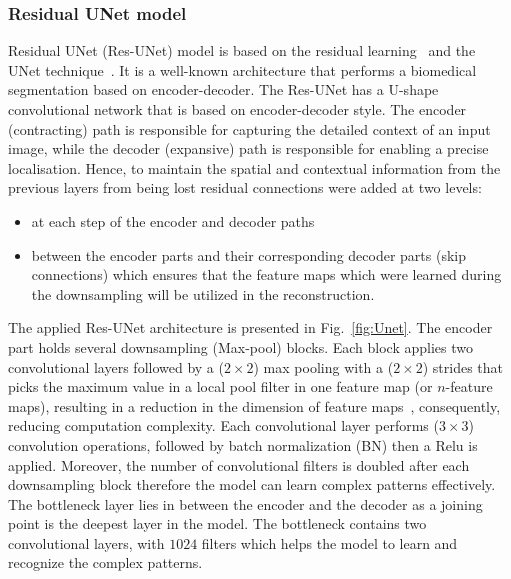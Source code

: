 \subsubsection{Residual UNet model}
Residual UNet (Res-UNet) model is based on the residual learning~\cite{He2016} and the UNet technique~\cite{Ronneberger2015}. 
It is a well-known architecture that performs a biomedical segmentation based on encoder-decoder. 
The Res-UNet has a U-shape convolutional network that is based on encoder-decoder style. 
The encoder (contracting) path is responsible for capturing the detailed context of an input image, while the decoder (expansive) path is responsible for enabling a precise localisation. 
Hence, to maintain the spatial and contextual information from the previous layers from being lost residual connections were added at two levels:
\begin{itemize}
	\item at each step of the encoder and decoder paths
	\item between the encoder parts and their corresponding decoder parts (skip connections) which ensures that the feature maps which were learned during the downsampling will be utilized in the reconstruction. 
\end{itemize}
The applied Res-UNet architecture is presented in Fig.~\ref{fig:Unet}.
The encoder part holds several downsampling (Max-pool) blocks. 
Each block applies two convolutional layers followed by a (\(2\times2\)) max pooling with a (\(2\times2\)) strides that picks the maximum value in a local pool filter in one feature map (or \(n\)-feature maps), resulting in a reduction in the dimension of feature maps~\cite{Lecun2015}, consequently, reducing computation complexity.
Each convolutional layer performs (\(3\times3\)) convolution operations, followed by batch normalization (BN) then a Relu is applied.
Moreover, the number of convolutional filters is doubled after each downsampling block therefore the model can learn complex patterns effectively. 
The bottleneck layer lies in between the encoder and the decoder as a joining point is the deepest layer in the model.
The bottleneck contains two convolutional layers, with \(1024\) filters which helps the model to learn and recognize the complex patterns.
